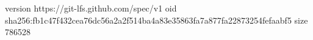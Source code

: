 version https://git-lfs.github.com/spec/v1
oid sha256:fb1c47f432cea76dc56a2a2f514ba4a83e35863fa7a877fa22873254fefaabf5
size 786528

